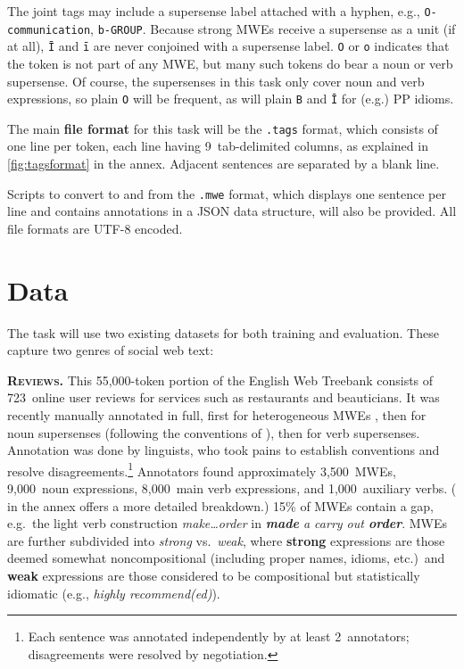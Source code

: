\documentclass[11pt]{article}
\newcommand{\lex}[1]{\textit{#1}} %
\newcommand{\longversion}[1]{} %
\begin{document}
The joint tags may include a supersense label attached with a hyphen, 
e.g., \texttt{O-communication}, \texttt{b-GROUP}.
Because strong MWEs receive a supersense as a unit (if at all), 
\texttt{Ī} and \texttt{ī} are never conjoined with a supersense label.
\texttt{O} or \texttt{o} indicates that the token is not part of any MWE, 
but many such tokens do bear a noun or verb supersense.
Of course, the supersenses in this task only cover noun and verb expressions, 
so plain \texttt{O} will be frequent, as will plain \texttt{B} and \texttt{Ī} for (e.g.) PP idioms.

The main \textbf{file format} for this task will be the \texttt{.tags} format, 
which consists of one line per token, each line having 9~tab-delimited columns, 
as explained in \cref{fig:tagsformat} in the annex.
Adjacent sentences are separated by a blank line.

Scripts to convert to and from the \texttt{.mwe} format, which displays one sentence per line 
and contains annotations in a JSON data structure, will also be provided.
All file formats are UTF-8 encoded.

\section{Data}\label{sec:data}

The task will use two existing datasets for both training and evaluation. 
These capture two genres of social web text:

\textbf{\textsc{Reviews}.} This 55,000-token portion of the English Web Treebank \citep[EWTB;][]{ewtb} 
consists of 723~online user reviews for services such as restaurants and beauticians.\longversion{\footnote{Each review is a separate document; 
no metadata about the reviews is available. EWTB provides sentence segmentation, word tokenization, and a Penn Treebank--style 
syntactic parse of each sentence.}}
It was recently manually annotated in full, first for heterogeneous MWEs \citep[released as the CMWE Corpus\footnote{\url{http://www.ark.cs.cmu.edu/LexSem/}}]{schneider-14-corpus}, 
then for noun supersenses (following the conventions of \citealp{schneider-12}), then for verb supersenses. 
Annotation was done by linguists, who took pains to establish conventions and resolve disagreements.\footnote{Each 
sentence was annotated independently by at least 2~annotators; disagreements were resolved by negotiation.} 
Annotators found approximately 3,500~MWEs, 9,000~noun expressions, 8,000~main verb expressions, and 1,000~auxiliary verbs. 
( in the annex offers a more detailed breakdown.)
15\% of MWEs contain a gap, e.g.~the light verb construction \lex{make\ldots order} in
\emph{\textbf{made} a carry out \textbf{order}}.
MWEs are further subdivided into \emph{strong} vs.~\emph{weak}, 
where \textbf{strong} expressions are those deemed somewhat noncompositional (including proper names, idioms, etc.)~and 
\textbf{weak} expressions are those considered to be compositional but statistically idiomatic (e.g., \lex{highly recommend(ed)}).
\end{document}
